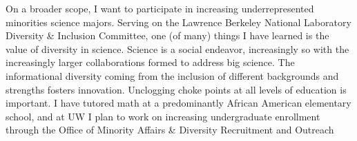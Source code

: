 \documentclass{article}
\begin{document}
On a broader scope, I want to participate in increasing underrepresented minorities science majors.
Serving on the Lawrence Berkeley National Laboratory Diversity \& Inclusion Committee, one (of many) things I have
learned is the value of diversity in science.  Science is a social endeavor, increasingly so with
the increasingly larger collaborations formed to address big science.  The informational diversity
coming  from the inclusion of different  backgrounds and strengths fosters innovation.
Unclogging choke points at all levels of education is important.  I have tutored math at a predominantly African American
elementary school, and at UW I plan to work on increasing undergraduate enrollment through the
Office of Minority Affairs \& Diversity Recruitment and Outreach
\end{document}
